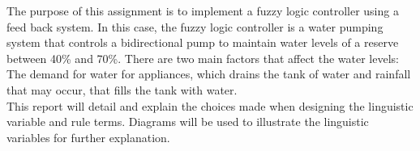 
The purpose of this assignment is to implement a fuzzy logic controller using a feed back system. In this case, the fuzzy logic controller is a water pumping system that controls a bidirectional pump to maintain water levels of a reserve between 40\% and 70\%. There are two main factors that affect the water levels: The demand for water for appliances, which drains the tank of water and rainfall that may occur, that fills the tank with water. \\
This report will detail and explain the choices made when designing the linguistic variable and rule terms. Diagrams will be used to illustrate the linguistic variables for further explanation. 
